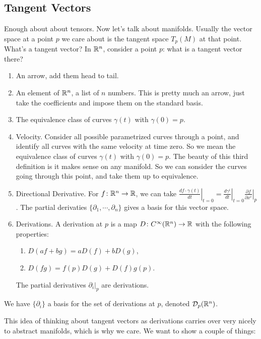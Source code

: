 \subsection{Tangent Vectors}
Enough about about tensors. Now let's talk about manifolds. Usually the vector space at a point $p$ we care about is the tangent space $T_p(M)$ at that point. What's a tangent vector? In $\mathbb{R}^n $, consider a point $p$: what is a tangent vector there? 
\begin{enumerate}
    \item An arrow, add them head to tail.
    \item An element of $\mathbb{R}^n $, a list of $n$ numbers. This is pretty much an arrow, just take the coefficients and impose them on the standard basis.
    \item The equivalence class of curves $\gamma (t)$ with $\gamma (0)=p$.
    \item Velocity. Consider all possible parametrized curves through a point, and identify all curves with the same velocity at time zero. So we mean the equivalence class of curves $\gamma (t)$ with $\gamma (0)=p$. The beauty of this third definition is it makes sense on any manifold. So we can sonsider the curves going through this point, and take them up to equivalence.
    \item Directional Derivative. For $f \colon \mathbb{R}^n  \to \mathbb{R}$, we can take $\left. \frac{d f\cdot \gamma (t)}{dt} \right| _{t=0}=\left. \frac{d\gamma ^i }{dt} \right|_{t=0}\left. \frac{\partial f}{\partial x^i } \right| _p $. The partial derivaties $\{\partial_1,\cdots ,\partial_n  \} $ gives a basis for this vector space.
                \item Derivations. A derivation at $p$ is a map $D \colon C^{\infty}(\mathbb{R}^n ) \to \mathbb{R}$ with the following properties:
                    \begin{enumerate}[label=(\arabic*)]
                        \item $D(af+bg)=aD(f)+b D(g)$,
                        \item $D(fg)=f(p)D(g)+D(f)g(p)$.
                    \end{enumerate}
                    The partial derivatives $\partial _i |_p$ are derivations.
\end{enumerate}
\begin{claim}
    We have $\{\partial _i \} $ a basis for the set of derivations at $p$, denoted $\mathcal{D} _p(\mathbb{R}^n )$.
\end{claim}
This idea of thinking about tangent vectors as derivations carries over very nicely to abstract manifolds, which is why we care. We want to show a couple of things:
